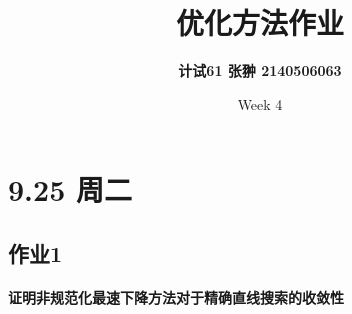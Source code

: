 \documentclass[UTF8]{ctexart}
\title{\Large \textbf{优化方法作业}}
\author{\textbf{计试61 张翀 2140506063}}
\date{Week 4}
\theoremstyle{Defination}
\theoremstyle{remark}
\begin{document}
\maketitle



\section*{9.25 周二}

\subsection*{作业1}

\paragraph{证明非规范化最速下降方法对于精确直线搜索的收敛性}
\end{document}
